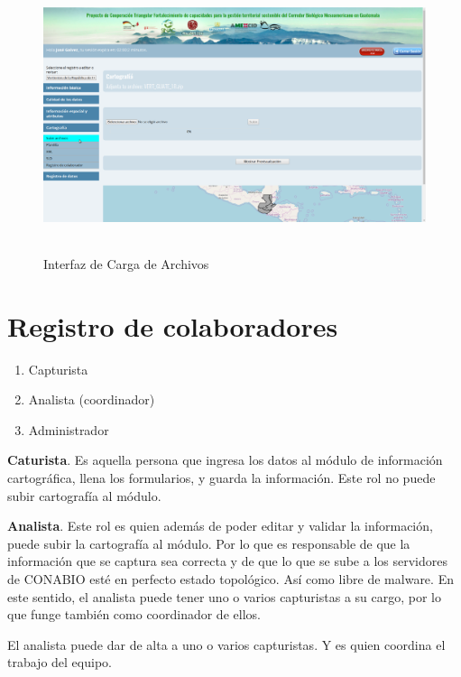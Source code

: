\documentclass[twoside]{book}
\begin{document}
\begin{figure}[h!] %
	\includegraphics[width=12cm, height=8cm]{img/cartografiaCargaArchivos} %
	\caption{Interfaz de Carga de Archivos}
\end{figure}

\section{Registro de colaboradores}

\begin{enumerate}
\item Capturista
\item Analista (coordinador)
\item Administrador
\end{enumerate}

\textbf{Caturista}. Es aquella persona que ingresa los datos al módulo de información cartográfica, llena los formularios, y guarda la información. Este rol no puede subir cartografía al módulo.

\textbf{Analista}. Este rol es quien además de poder editar y validar la información, puede subir la cartografía al módulo. Por lo que es responsable de que la información que se captura sea correcta y de que lo que se sube a los servidores de CONABIO esté en perfecto estado topológico. Así como libre de malware. En este sentido, el analista puede tener uno o varios capturistas a su cargo, por lo que funge también como coordinador de ellos.

El analista puede dar de alta a uno o varios capturistas. Y es quien coordina el trabajo del equipo.   
\end{document}
